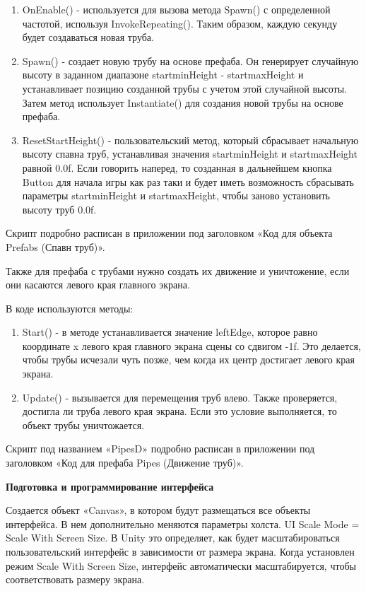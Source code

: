 \documentclass[14pt, oneside]{altsu-report}
\begin{document}
\begin{enumerate}
\item OnEnable() - используется для вызова метода Spawn() с определенной частотой, используя InvokeRepeating(). Таким образом, каждую секунду будет создаваться новая труба.
\item Spawn() - создает новую трубу на основе префаба. Он генерирует случайную высоту в заданном диапазоне startminHeight - startmaxHeight и устанавливает позицию созданной трубы с учетом этой случайной высоты. Затем метод использует Instantiate() для создания новой трубы на основе префаба.
\item ResetStartHeight() - пользовательский метод, который сбрасывает начальную высоту спавна труб, устанавливая значения startminHeight и startmaxHeight равной 0.0f. Если говорить наперед, то созданная в дальнейшем кнопка Button для начала игры как раз таки и будет иметь возможность сбрасывать параметры startminHeight и startmaxHeight, чтобы заново установить высоту труб 0.0f.
\end{enumerate} 

Скрипт подробно расписан в приложении под заголовком «Код для объекта Prefabs (Спавн труб)».

Также для префаба с трубами нужно создать их движение и уничтожение, если они касаются левого края главного экрана. 

В коде используются методы:

\begin{enumerate}
\item Start() - в методе устанавливается значение leftEdge, которое равно координате x левого края главного экрана сцены со сдвигом -1f. Это делается, чтобы трубы исчезали чуть позже, чем когда их центр достигает левого края экрана.
\item Update() - вызывается для перемещения труб влево. Также проверяется, достигла ли труба левого края экрана. Если это условие выполняется, то объект трубы уничтожается.
\end{enumerate} 

Скрипт под названием «PipesD» подробно расписан в приложении под заголовком «Код для префаба Pipes (Движение труб)».

\textbf{Подготовка и программирование интерфейса}

Создается объект «Canvas», в котором будут размещаться все объекты интерфейса. В нем дополнительно меняются параметры холста. UI Scale Mode = Scale With Screen Size. В Unity это определяет, как будет масштабироваться пользовательский интерфейс в зависимости от размера экрана. Когда установлен режим Scale With Screen Size, интерфейс автоматически масштабируется, чтобы соответствовать размеру экрана. 
\end{document}
